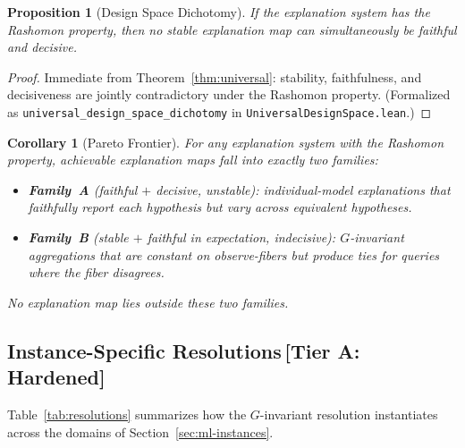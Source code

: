 \documentclass[11pt,a4paper]{article}
\newtheorem{corollary}[theorem]{Corollary}
\newtheorem{proposition}[theorem]{Proposition}
\begin{document}
\begin{proposition}[Design Space Dichotomy]
\label{prop:dichotomy}
If the explanation system has the Rashomon property, then no stable
explanation map can simultaneously be faithful and decisive.
\end{proposition}

\begin{proof}
Immediate from Theorem~\ref{thm:universal}: stability, faithfulness, and
decisiveness are jointly contradictory under the Rashomon property.
(Formalized as \texttt{universal\_design\_space\_dichotomy} in
\texttt{UniversalDesignSpace.lean}.)
\end{proof}

\begin{corollary}[Pareto Frontier]
\label{cor:pareto}
For any explanation system with the Rashomon property, achievable
explanation maps fall into exactly two families:
\begin{itemize}
  \item \textbf{Family~A} (faithful $+$ decisive, unstable): individual-model
    explanations that faithfully report each hypothesis but vary across
    equivalent hypotheses.
  \item \textbf{Family~B} (stable $+$ faithful in expectation, indecisive):
    $G$-invariant aggregations that are constant on observe-fibers but
    produce ties for queries where the fiber disagrees.
\end{itemize}
No explanation map lies outside these two families.
\end{corollary}

\subsection{Instance-Specific Resolutions\,\textnormal{\normalsize[Tier A: Hardened]}}
\label{sec:resolution-instances}

Table~\ref{tab:resolutions} summarizes how the $G$-invariant resolution
instantiates across the domains of Section~\ref{sec:ml-instances}.
\end{document}
